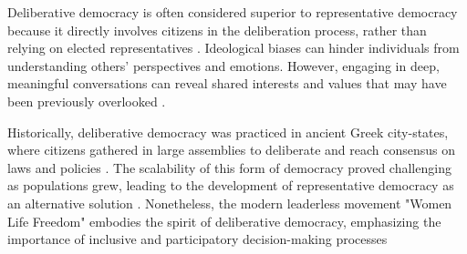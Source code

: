 \documentclass{IEEEtran}
\begin{document}
Deliberative democracy is often considered superior to representative democracy because it directly involves citizens in the deliberation process, rather than relying on elected representatives \cite{mansbridge1999everyday}. Ideological biases can hinder individuals from understanding others' perspectives and emotions. However, engaging in deep, meaningful conversations can reveal shared interests and values that may have been previously overlooked \cite{bachtiger2018deliberative}.

Historically, deliberative democracy was practiced in ancient Greek city-states, where citizens gathered in large assemblies to deliberate and reach consensus on laws and policies \cite{ober1998polis}. The scalability of this form of democracy proved challenging as populations grew, leading to the development of representative democracy as an alternative solution \cite{manin1997principles}. Nonetheless, the modern leaderless movement "Women Life Freedom" embodies the spirit of deliberative democracy, emphasizing the importance of inclusive and participatory decision-making processes 


\end{document}
